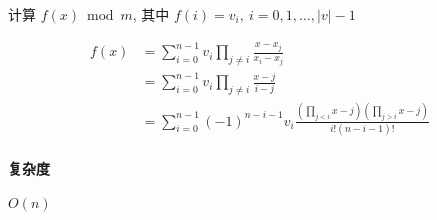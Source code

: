 计算 \(f(x) \bmod m\), 其中 \(f(i) = v_i,~i = 0,1,\dots,|v|-1\)

\[
    \begin{aligned}
        f(x) & =\sum_{i=0}^{n-1} v_i \prod_{j\ne i} \frac{x-x_j}{x_i-x_j}                               \\
             & =\sum_{i=0}^{n-1} v_i \prod_{j\ne i} \frac{x-j}{i-j}                                     \\
             & =\sum_{i=0}^{n-1} (-1)^{n-i-1} v_i \frac{(\prod_{j<i} x-j)(\prod_{j>i} x-j)}{i!(n-i-1)!}
    \end{aligned}
\]

\paragraph{复杂度}

\(O(n)\)